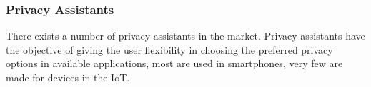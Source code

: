 \documentclass[conference]{IEEEtran}
\begin{document}



\subsubsection{Privacy Assistants}

There exists a number of privacy assistants in the market. Privacy assistants
have the objective of giving the user flexibility in choosing the preferred
privacy options in available applications, most are used in smartphones,
very few are made for devices in the IoT.
\end{document}
